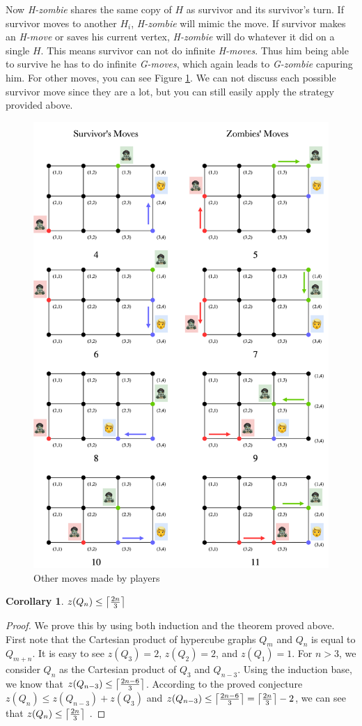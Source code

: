 \documentclass[1p]{elsarticle}
\DeclarePairedDelimiter\ceil{\lceil}{\rceil} \DeclarePairedDelimiter\floor{\lfloor}{\rfloor}
\newtheorem{corollary}[theorem]{Corollary}
\begin{document}
Now {\it H-zombie} shares the same copy of $H$ as survivor and its survivor's turn. If survivor moves to another $H_i$,
{\it H-zombie} will mimic the move. If survivor makes an {\it H-move} or saves his current vertex, {\it H-zombie} will
do whatever it did on a single $H$. This means survivor can not do infinite {\it H-moves}. Thus him being able to
survive he has to do infinite {\it G-moves}, which again leads to {\it G-zombie} capuring him. For other moves, you can
see Figure \ref{fig:p6}. We can not discuss each possible survivor move since they are a lot, but you can still easily
apply the strategy provided above. 
\begin{figure}[h!]
	\centering
	\includegraphics[width=0.6\linewidth]{fig/p34m6.png}
	\caption{Other moves made by players}
	\label{fig:p6}
\end{figure}

\begin{corollary}
	\label{C3}
	$z(Q_{n}) \leq \ceil*{\frac{2n}{3}}$
\end{corollary}
\begin{proof}
	We prove this by using both induction and the theorem proved above. First note that the Cartesian product of
	hypercube graphs $Q_{m}$ and $Q_{n}$ is equal to $Q_{m+n}$. It is easy to see $z(Q_3) = 2$, $z(Q_2) = 2$, and
	$z(Q_1) = 1$. For $n > 3$, we consider $Q_n$ as the Cartesian product of $Q_3$ and $Q_{n-3}$. Using the induction
	base, we know that $z(Q_{n-3}) \leq \ceil*{\frac{2n - 6}{3}}$.  According to the proved conjecture $z(Q_n) \leq
	z(Q_{n-3}) + z(Q_3)$ and $z(Q_{n-3}) \leq \ceil*{\frac{2n - 6}{3}} = \ceil*{\frac{2n}{3}} - 2$, we can see that
	$z(Q_n) \leq \ceil*{\frac{2n}{3}}$ .
\end{proof}
\end{document}
